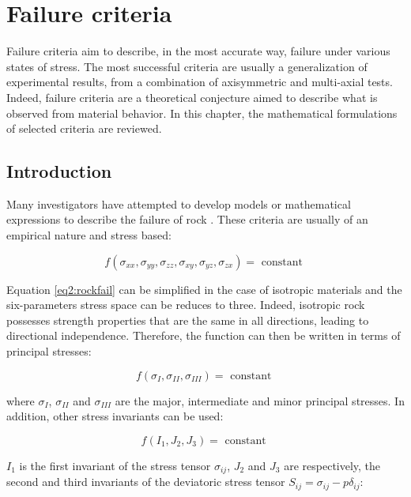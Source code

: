 \chapter{Failure criteria}\label{ch2:title}

Failure criteria aim to describe, in the most accurate way, failure under various states of stress. The most successful criteria are usually a generalization of experimental results, from a combination of axisymmetric and multi-axial tests. Indeed, failure criteria are a theoretical conjecture aimed to describe what is observed from material behavior. In this chapter, the mathematical formulations of selected criteria are reviewed.

\section{Introduction}\label{ch2:background}

Many investigators have attempted to develop models or mathematical expressions to describe the failure of rock \cite{Labuz2018}. These criteria are usually of an empirical nature and stress based: 

\begin{equation}\label{eq2:rockfail}
    f\left(\sigma_{x x}, \sigma_{y y}, \sigma_{z z}, \sigma_{x y}, \sigma_{y z}, \sigma_{z x}\right)=\text { constant }
\end{equation}

Equation \ref{eq2:rockfail} can be simplified in the case of isotropic materials and the six-parameters stress space can be reduces to three. Indeed, isotropic rock possesses strength properties that are the same in all directions, leading to directional independence. Therefore, the function can then be written in terms of principal stresses: 

\begin{equation}\label{eq2:fsigconst}
    f\left(\sigma_{I}, \sigma_{II}, \sigma_{III} \right)=\text { constant }
\end{equation}

where $\sigma_{I}$, $\sigma_{II}$ and $\sigma_{III}$ are the major, intermediate and minor principal stresses. In addition, other stress invariants can be used:

\begin{equation}\label{eq2:fijjconst}
    f\left(I_{1}, J_{2}, J_{3} \right)=\text { constant }
\end{equation}

$I_{1}$ is the first invariant of the stress tensor $\sigma_{ij}$, $J_{2}$ and $J_{3}$ are respectively, the second and third invariants of the deviatoric stress tensor $S_{ij}=\sigma_{ij}-p\delta_{ij}$: 

